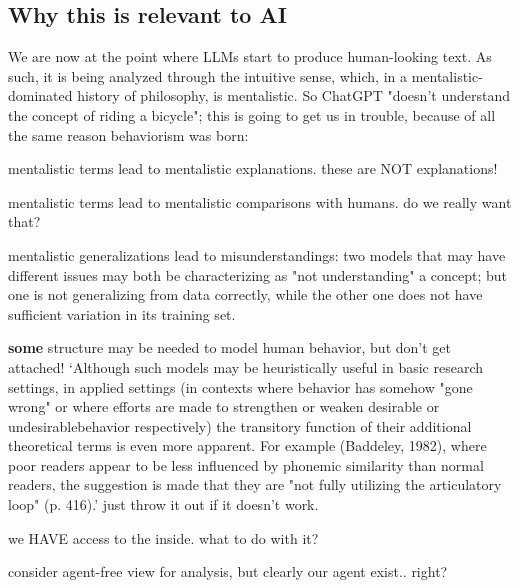 \documentclass[letterpaper,11pt,twocolumn]{article}
\begin{document}
\subsection*{Why this is relevant to AI}
We are now at the point where LLMs start to produce human-looking text. As such, it is being analyzed through the intuitive sense, which, in a mentalistic-dominated history of philosophy, is mentalistic. So ChatGPT "doesn't understand the concept of riding a bicycle"; this is going to get us in trouble, because of all the same reason behaviorism was born:
\begin{inlinelist}
    \item mentalistic terms lead to mentalistic explanations. these are NOT explanations!
    \item mentalistic terms lead to mentalistic comparisons with humans. do we really want that?
    \item mentalistic generalizations lead to misunderstandings: two models that may have different issues may both be characterizing as "not understanding" a concept; but one is not generalizing from data correctly, while the other one does not have sufficient variation in its training set.
    \item \textbf{some} structure may be needed to model human behavior, but don't get attached! \enquote*{Although such models may be heuristically useful in basic research settings, in applied settings (in contexts where behavior has somehow "gone wrong" or where efforts are made to strengthen or weaken desirable or undesirablebehavior respectively) the transitory function of their additional theoretical terms is even more apparent. For example (Baddeley, 1982), where poor readers appear to be less influenced by phonemic similarity than normal readers, the suggestion is made that they are "not fully utilizing the articulatory loop" (p. 416).}\cite{chiesaRadicalBehaviorismPhilosophy1994} just throw it out if it doesn't work.
    \item we HAVE access to the inside. what to do with it?
    \item consider agent-free view for analysis, but clearly our agent exist.. right?
\end{inlinelist}
\end{document}
